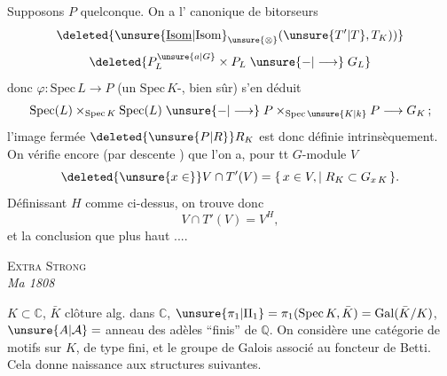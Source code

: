Supposons $P$ quelconque. On a l' canonique de bitorseurs
\[
\deleted{\unsure{\underline{\mathrm{Isom}}|{\mathrm{Isom}}}_{\unsure{\otimes}}(\unsure{T'|T},T_K))}
\]
\[
\deleted{P_L^{\unsure{a|G}}\times P_L\mathrel{\unsure{-|\longrightarrow}}G_L}
\]
donc $\varphi\colon\mathrm{Spec}\,L\longrightarrow P$ (un $\mathrm{Spec}\,K$-, bien sûr) s'en déduit 
\[
\mathrm{Spec}(L)\times_{\mathrm{Spec}\,K}\mathrm{Spec}(L)\mathrel{\unsure{-|\longrightarrow}}
P\times_{\mathrm{Spec}\,\unsure{K|k}}P\longrightarrow G_K\,;
\]
l'image fermée $\deleted{\unsure{P|R}}R_K$ est donc définie intrinsèquement. On vérifie encore (par descente ) que  l'on a, pour tt $G$-module $V$
\[
\deleted{\unsure{x\in}}V\cap T'(V)=\{\,x\in V,\mid R_K\subset G_{x\,K}\,\}.
\]
Définissant $H$ comme ci-dessus, on trouve donc
\[
V\cap T'(V)=V^H,
\]
et la  conclusion que plus haut ....
{\centering \textsc{Extra Strong}\\
\textit{Ma 1808}\par}
$K\subset\mathbb C$, $\bar K$ clôture alg. dans $\mathbb C$, $\unsure{\pi_1|\Pi_1}=\pi_1(\mathrm{Spec}\,K,\bar K)=\mathrm{Gal}(\bar K/K)$, $\unsure{A|\mathcal A}={}$anneau des adèles ``finis'' de $\mathbb Q$. On considère une catégorie de motifs sur $K$, de type fini, et le groupe de Galois  associé au foncteur de Betti. Cela donne naissance aux structures suivantes.

